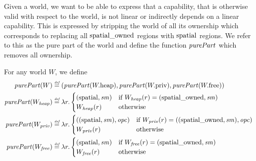 \begin{jversion}
Given a world, we want to be able to express that a capability, that is otherwise valid with respect to the world, is not linear or indirectly depends on a linear capability.
This is expressed by stripping the world of all its ownership which corresponds to replacing all $\mathrm{spatial\_owned}$ regions with $\mathrm{spatial}$ regions.
We refer to this as the pure part of the world and define the function $\purePart{}$ which removes all ownership.
\begin{definition}
  \label{def:purePart}
  For any world $W$, we define
  \begin{align*}
    \purePart{W} &\defeq (\purePart{\pwheap},\purePart{\pwpriv},\purePart{\pwfree})\\
    \purePart{W_\var{heap}} &\defeq \lambda r\ldotp
                       \begin{cases}
                         (\spatial,\var{sm}) & \text{if } W_\var{heap}(r) = (\spatialo,\var{sm})\\
                         W_{\var{heap}}(r) & \text{otherwise}
                       \end{cases}\\
    \purePart{W_\var{priv}} &\defeq \lambda r\ldotp
                       \begin{cases}
                         ((\spatial,\var{sm}),\opc) & \text{if } W_\var{priv}(r) = ((\spatialo,\var{sm}),\opc)\\
                         W_\var{priv}(r) & \text{otherwise}
                       \end{cases}\\
    \purePart{W_\var{free}} &\defeq \lambda r\ldotp
                       \begin{cases}
                         (\spatial,\var{sm}) & \text{if } W_{\var{free}}(r) = (\spatialo,\var{sm})\\
                         W_{\var{free}}(r) & \text{otherwise}
                       \end{cases}
  \end{align*}
\end{definition}

\end{jversion}
